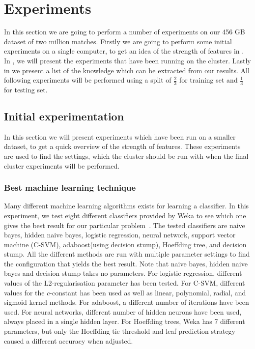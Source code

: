 \section{Experiments}\label{sec:testing}
In this section we are going to perform a number of experiments on our 456 GB dataset of two million matches. Firstly we are going to perform some initial experiments on a single computer, to get an idea of the strength of features in . In , we will present the experiments that have been running on the cluster. Lastly in  we present a list of the knowledge which can be extracted from our results. All following experiments will be performed using a split of $\frac{2}{3}$ for training set and $\frac{1}{3}$ for testing set. 

\subsection{Initial experimentation}\label{sec:initialtest}
In this section we will present experiments which have been run on a smaller dataset, to get a quick overview of the strength of features. These experiments are used to find the settings, which the cluster should be run with when the final cluster experiments will be performed. 

\subsubsection{Best machine learning technique}
Many different machine learning algorithms exists for learning a classifier. In this experiment, we test eight different classifiers provided by Weka to see which one gives the best result for our particular problem~\cite{weka}. The tested classifiers are naive bayes, hidden naive bayes, logistic regression, neural network, support vector machine (C-SVM), adaboost(using decision stump), Hoeffding tree, and decision stump. All the different methods are run with multiple parameter settings to find the configuration that yields the best result. Note that naive bayes, hidden naive bayes and decision stump takes no parameters. For logistic regression, different values of the L2-regularisation parameter has been tested. For C-SVM, different values for the $c$-constant has been used as well as linear, polynomial, radial, and sigmoid kernel methods. For adaboost, a different number of iterations have been used. For neural networks, different number of hidden neurons have been used, always placed in a single hidden layer. For Hoeffding trees, Weka has 7 different parameters, but only the Hoeffding tie threshold and leaf prediction strategy caused a different accuracy when adjusted.


